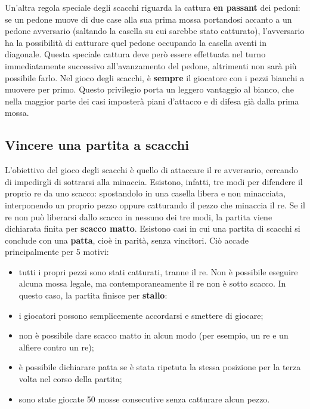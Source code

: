 Un'altra regola speciale degli scacchi riguarda la cattura \textbf{en passant} dei pedoni: se un pedone muove di due case alla sua prima mossa portandosi accanto a un pedone avversario (saltando la casella su cui sarebbe stato catturato), l'avversario ha la possibilità di catturare quel pedone occupando la casella aventi in diagonale. Questa speciale cattura deve però essere effettuata nel turno immediatamente successivo all'avanzamento del pedone, altrimenti non sarà più possibile farlo.
Nel gioco degli scacchi, è \textbf{sempre} il giocatore con i pezzi bianchi a muovere per primo. Questo privilegio porta un leggero vantaggio al bianco, che nella maggior parte dei casi imposterà piani d'attacco e di difesa già dalla prima mossa.

\subsection{Vincere una partita a scacchi}
L'obiettivo del gioco degli scacchi è quello di attaccare il re avversario, cercando di impedirgli di sottrarsi alla minaccia. Esistono, infatti, tre modi per difendere il proprio re da uno scacco: spostandolo in una casella libera e non minacciata, interponendo un proprio pezzo oppure catturando il pezzo che minaccia il re. Se il re non può liberarsi dallo scacco in nessuno dei tre modi, la partita viene dichiarata finita per \textbf{scacco matto}. Esistono casi in cui una partita di scacchi si conclude con una \textbf{patta}, cioè in parità, senza vincitori. Ciò accade principalmente per 5 motivi:
\begin{itemize}
    \item tutti i propri pezzi sono stati catturati, tranne il re. Non è possibile eseguire alcuna mossa legale, ma contemporaneamente il re non è sotto scacco. In questo caso, la partita finisce per \textbf{stallo}:
    \item i giocatori possono semplicemente accordarsi e smettere di giocare;
    \item non è possibile dare scacco matto in alcun modo (per esempio, un re e un alfiere contro un re);
    \item è possibile dichiarare patta se è stata ripetuta la stessa posizione per la terza volta nel corso della partita;
    \item sono state giocate 50 mosse consecutive senza catturare alcun pezzo.
\end{itemize}
